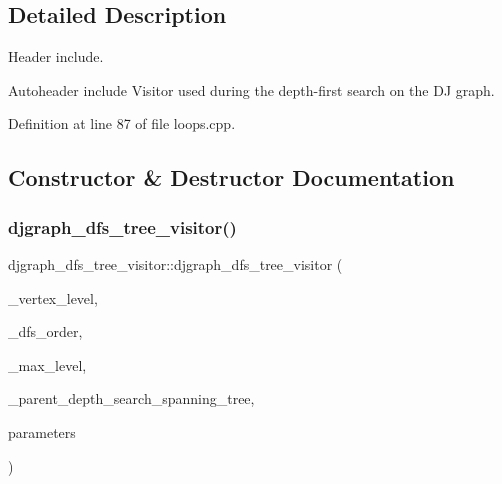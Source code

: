 \subsection{Detailed Description}
Header include. 

Autoheader include Visitor used during the depth-\/first search on the DJ graph. 

Definition at line 87 of file loops.\+cpp.



\subsection{Constructor \& Destructor Documentation}
\mbox{\label{structdjgraph__dfs__tree__visitor_ab2e0fa3a5366a2fccf73f5bd48066dde}} 
\subsubsection{\texorpdfstring{djgraph\+\_\+dfs\+\_\+tree\+\_\+visitor()}{djgraph\_dfs\_tree\_visitor()}}
{\footnotesize\ttfamily djgraph\+\_\+dfs\+\_\+tree\+\_\+visitor\+::djgraph\+\_\+dfs\+\_\+tree\+\_\+visitor (\begin{DoxyParamCaption}\item[{\hyperlink{custom__map_8hpp_ad1ed68f2ff093683ab1a33522b144adc}{Custom\+Unordered\+Map}$<$ \hyperlink{graph_8hpp_abefdcf0544e601805af44eca032cca14}{vertex}, unsigned int $>$ \&}]{\+\_\+vertex\+\_\+level,  }\item[{\hyperlink{custom__map_8hpp_ad1ed68f2ff093683ab1a33522b144adc}{Custom\+Unordered\+Map}$<$ \hyperlink{graph_8hpp_abefdcf0544e601805af44eca032cca14}{vertex}, unsigned int $>$ \&}]{\+\_\+dfs\+\_\+order,  }\item[{unsigned int \&}]{\+\_\+max\+\_\+level,  }\item[{\hyperlink{structvertex2obj}{vertex2obj}$<$ \hyperlink{graph_8hpp_abefdcf0544e601805af44eca032cca14}{vertex} $>$ \&}]{\+\_\+parent\+\_\+depth\+\_\+search\+\_\+spanning\+\_\+tree,  }\item[{const \hyperlink{Parameter_8hpp_a37841774a6fcb479b597fdf8955eb4ea}{Parameter\+Const\+Ref}}]{parameters }\end{DoxyParamCaption})\hspace{0.3cm}{\ttfamily [inline]}}



